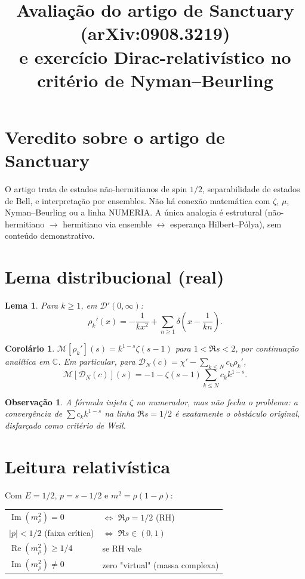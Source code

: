 \documentclass[12pt,a4paper]{article}
\title{Avaliação do artigo de Sanctuary (arXiv:0908.3219) \\
e exercício Dirac-relativístico no critério de Nyman--Beurling}
\author{}
\date{}
\newtheorem{lema}{Lema}
\newtheorem{corolario}{Corolário}
\newtheorem{observacao}{Observação}
\begin{document}
\maketitle

\section{Veredito sobre o artigo de Sanctuary}

O artigo trata de estados não-hermitianos de spin $1/2$, separabilidade
de estados de Bell, e interpretação por ensembles. Não há conexão
matemática com $\zeta$, $\mu$, Nyman--Beurling ou a linha NUMERIA. A
única analogia é estrutural (não-hermitiano $\to$ hermitiano via
ensemble $\leftrightarrow$ esperança Hilbert--Pólya), sem conteúdo
demonstrativo.

\section{Lema distribucional (real)}

\begin{lema}
Para $k\ge 1$, em $\mathcal{D}'(0,\infty)$:
\[
\rho_k'(x) = -\frac{1}{kx^2} + \sum_{n\ge 1}\delta\!\left(x-\frac{1}{kn}\right).
\]
\end{lema}

\begin{corolario}
$\mathcal{M}[\rho_k'](s) = k^{1-s}\zeta(s-1)$ para $1<\Re s<2$, por
continuação analítica em $\mathbb{C}$. Em particular, para
$\mathcal{D}_N(c)=\chi' - \sum_{k\le N}c_k\rho_k'$,
\[
\mathcal{M}[\mathcal{D}_N(c)](s) = -1 - \zeta(s-1)\sum_{k\le N}c_k k^{1-s}.
\]
\end{corolario}

\begin{observacao}
A fórmula injeta $\zeta$ no numerador, mas não fecha o problema: a
convergência de $\sum c_k k^{1-s}$ na linha $\Re s=1/2$ é exatamente
o obstáculo original, disfarçado como critério de Weil.
\end{observacao}

\section{Leitura relativística}

Com $E=1/2$, $p=s-1/2$ e $m^2=\rho(1-\rho)$:
\begin{center}
\begin{tabular}{ll}
$\operatorname{Im}(m_\rho^2)=0$ & $\iff$ $\Re\rho=1/2$ (RH) \\
$|p|<1/2$ (faixa crítica)      & $\iff$ $\Re s\in(0,1)$ \\
$\operatorname{Re}(m_\rho^2)\ge 1/4$ & se RH vale \\
$\operatorname{Im}(m_\rho^2)\ne 0$ & zero "virtual" (massa complexa)
\end{tabular}
\end{center}
\end{document}
